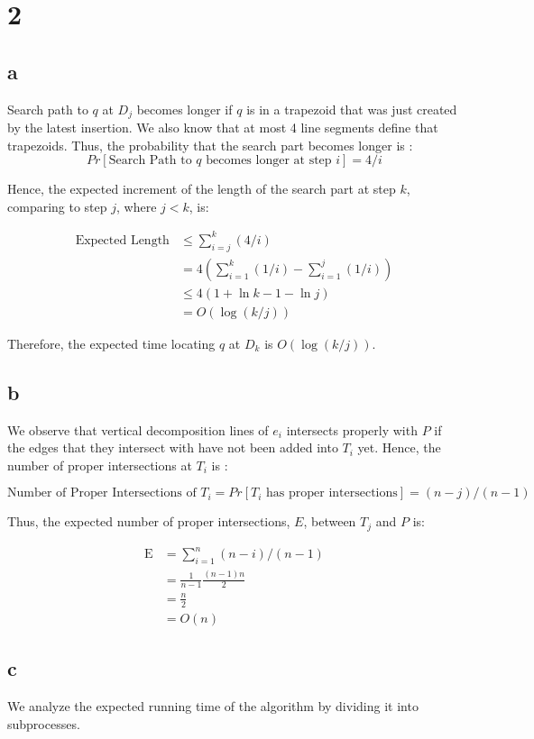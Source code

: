 
\section*{2}
\subsection*{a}
Search path to $q$ at $D_j$ becomes longer if $q$ is in a trapezoid that was just
created by the latest insertion. We also know that at most 4 line segments define
that trapezoids. Thus, the probability that the search part becomes longer is :
$$
Pr[\text{Search Path to $q$ becomes longer at step $i$}] = 4/i
$$

Hence, the expected increment of the length of the search part at step $k$, comparing to step $j$,
where $j<k$, is:

\begin{align*}
    \text{Expected Length} &\leq \sum_{i=j}^{k}( 4/i ) \\
    &= 4( \sum_{i=1}^{k}( 1/i ) -  \sum_{i=1}^{j}( 1/i ) ) \\
    &\leq 4( 1 + \ln k - 1 - \ln j ) \\
    &= O(\log(k/j))
\end{align*}

Therefore, the expected time locating $q$ at $D_k$ is $O(\log(k/j))$.

\subsection*{b}
We observe that vertical decomposition lines of $e_i$ intersects properly with $P$ if 
the edges that they intersect with have not been added into $T_i$ yet. Hence,
the number of proper intersections at $T_i$ is :

$$
\text{Number of Proper Intersections of $T_i$} = Pr[\text{$T_i$ has proper intersections}] = (n-j)/(n-1)
$$

Thus, the expected number of proper intersections, $E$, between $T_j$ and $P$ is:

\begin{align*}
    \text{E} &= \sum_{i=1}^{n}(n-i)/(n-1) \\
    &= \frac{1}{n-1}\frac{(n-1)n}{2} \\
    &= \frac{n}{2} \\
    &= O(n)
\end{align*}

\subsection*{c}
We analyze the expected running time of the algorithm by dividing it into subprocesses.

